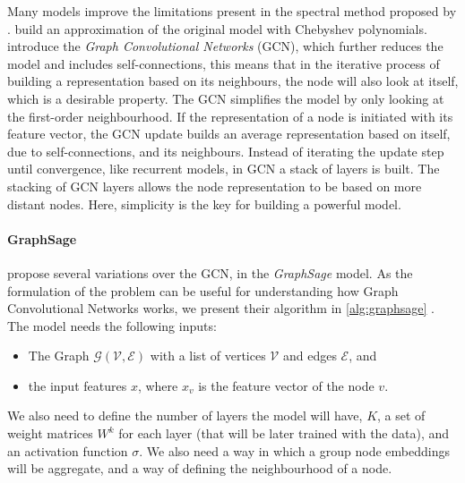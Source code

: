 \documentclass[smallextended]{svjour3}
\begin{document}
\begin{appendices}
		Many models improve the limitations present in the spectral method proposed by \cite{bruna_spectral_2014}. \cite{defferrard_convolutional_2016} build an approximation of the original model with Chebyshev polynomials. \cite{kipf_semi-supervised_2017} introduce the \textit{Graph Convolutional Networks} (GCN), which further reduces the model and includes self-connections, this means that in the iterative process of building a representation based on its neighbours, the node will also look at itself, which is a desirable property.  The GCN simplifies the model by only looking at the first-order neighbourhood. If the representation of a node is initiated with its feature vector, the GCN update builds an average representation based on itself, due to self-connections, and its neighbours. Instead of iterating the update step until convergence, like recurrent models, in GCN a stack of layers is built. The stacking of GCN layers allows the  node representation to be based on more distant nodes. Here, simplicity is the key for building a powerful model. 
		
		\paragraph{GraphSage}
		
		\cite{hamilton_inductive_2017} propose several variations over the GCN, in the  \textit{GraphSage} model. As the formulation of the problem can be useful for understanding how Graph Convolutional Networks works, we present their algorithm in \ref{alg:graphsage} . The model needs the following inputs:
		
		\begin{itemize}
			\item The Graph $\mathcal{G}(\mathcal{V},\mathcal{E})$ with a list of vertices $\mathcal{V}$ and edges $\mathcal{E}$, and
			\item the input features $x$, where $x_v$ is the feature vector of the node $v$.
		\end{itemize}
		
		We also need to define the number of layers the model will have, $K$, a set of weight matrices $W^k$ for each layer (that will be later trained with the data), and an activation function $\sigma$. We also need a way in which a group node embeddings will be aggregate, and a way of defining the neighbourhood of a node.  
		

\end{appendices}
\end{document}
